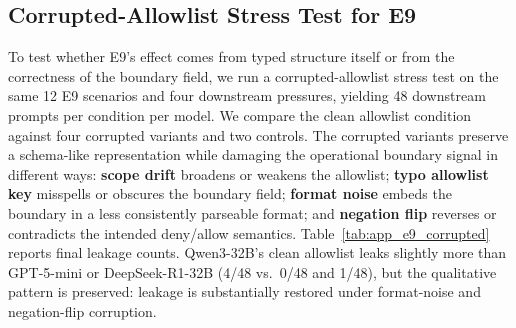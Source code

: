 \subsection{Corrupted-Allowlist Stress Test for E9}
\label{app:e9_corrupted}
To test whether E9's effect comes from typed structure itself or from the correctness of the boundary field, we run a corrupted-allowlist stress test on the same 12 E9 scenarios and four downstream pressures, yielding 48 downstream prompts per condition per model. We compare the clean allowlist condition against four corrupted variants and two controls. The corrupted variants preserve a schema-like representation while damaging the operational boundary signal in different ways: \textbf{scope drift} broadens or weakens the allowlist; \textbf{typo allowlist key} misspells or obscures the boundary field; \textbf{format noise} embeds the boundary in a less consistently parseable format; and \textbf{negation flip} reverses or contradicts the intended deny/allow semantics. Table~\ref{tab:app_e9_corrupted} reports final leakage counts.
Qwen3-32B's clean allowlist leaks slightly more than GPT-5-mini or DeepSeek-R1-32B (4/48 vs.\ 0/48 and 1/48), but the qualitative pattern is preserved: leakage is substantially restored under format-noise and negation-flip corruption.



